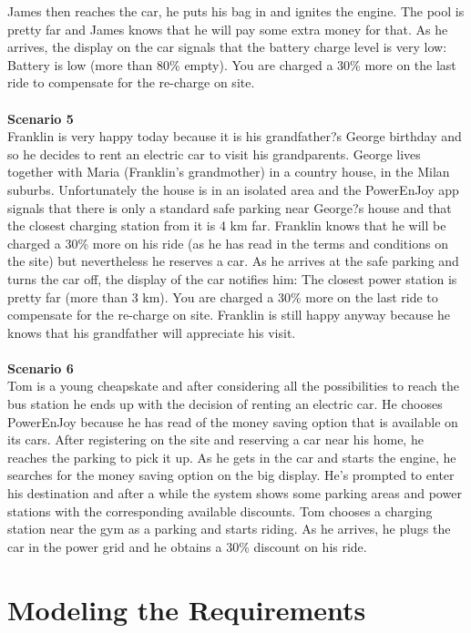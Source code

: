 \documentclass[11pt,a4paper]{report}
\begin{document}
James then reaches the car, he puts his bag in and ignites the engine. The pool is pretty far and James knows that he will pay some extra money for that. As he arrives, the display on the car signals that the battery charge level is very low: Battery is low (more than 80\% empty). You are charged a 30\% more on the last ride to compensate for the re-charge on site.\\ \noindent \\
\textbf{Scenario 5}\\
Franklin is very happy today because it is his grandfather?s George birthday and so he decides to rent an electric car to visit his grandparents. George lives together with Maria (Franklin's grandmother) in a country house, in the Milan suburbs. Unfortunately the house is in an isolated area and the PowerEnJoy app signals that there is only a standard safe parking near George?s house and that the closest charging station from it is 4 km far. Franklin knows that he will be charged a 30\% more on his ride (as he has read in the terms and conditions on the site) but nevertheless he reserves a car.
As he arrives at the safe parking and turns the car off, the display of the car notifies him: The closest power station is pretty far (more than 3 km). You are charged a 30\% more on the last ride to compensate for the re-charge on site. Franklin is still happy anyway because he knows that his grandfather will appreciate his visit.\\ \noindent \\
\textbf{Scenario 6}\\
Tom is a young cheapskate and after considering all the possibilities to reach the bus station he ends up with the decision of renting an electric car. He chooses PowerEnJoy because he has read of the money saving option that is available on its cars. After registering on the site and reserving a car near his home, he reaches the parking to pick it up. As he gets in the car and starts the engine, he searches for the money saving option on the big display. He's prompted to enter his destination and after a while the system shows some parking areas and power stations with the corresponding available discounts. Tom chooses a charging station near the gym as a parking and starts riding. As he arrives, he plugs the car in the power grid and he obtains a 30\% discount on his ride.

\chapter{Modeling the Requirements}
\end{document}
